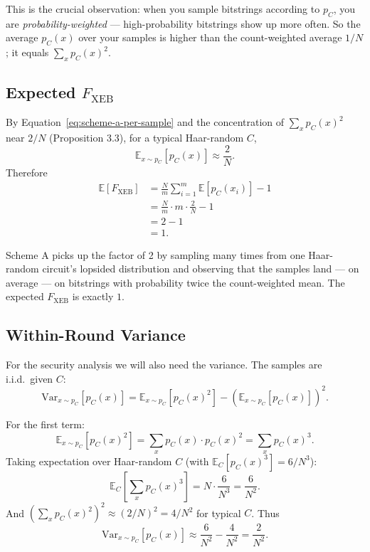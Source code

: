 \documentclass[11pt]{article}
\theoremstyle{plain}
\theoremstyle{definition}
\newcommand{\Fxeb}{F_{\text{XEB}}}
\newcommand{\E}{\mathbb{E}}
\newcommand{\Var}{\mathrm{Var}}
\begin{document}
\begin{intuition}
This is the crucial observation: when you sample bitstrings according to $p_C$, you are \emph{probability-weighted} --- high-probability bitstrings show up more often. So the average $p_C(x)$ over your samples is higher than the count-weighted average $1/N$; it equals $\sum_x p_C(x)^2$.
\end{intuition}

\subsection{Expected $\Fxeb$}

By Equation~\eqref{eq:scheme-a-per-sample} and the concentration of $\sum_x p_C(x)^2$ near $2/N$ (Proposition 3.3), for a typical Haar-random $C$,
\[
\E_{x \sim p_C}[p_C(x)] \approx \frac{2}{N}.
\]
Therefore
\begin{align}
\E[\Fxeb] &= \frac{N}{m} \sum_{i=1}^{m} \E[p_C(x_i)] - 1 \nonumber \\
          &= \frac{N}{m} \cdot m \cdot \frac{2}{N} - 1 \nonumber \\
          &= 2 - 1 \nonumber \\
          &= 1.
\label{eq:scheme-a-expectation}
\end{align}

\begin{intuition}
Scheme A picks up the factor of 2 by sampling many times from one Haar-random circuit's lopsided distribution and observing that the samples land --- on average --- on bitstrings with probability twice the count-weighted mean. The expected $\Fxeb$ is exactly $1$.
\end{intuition}

\subsection{Within-Round Variance}

For the security analysis we will also need the variance. The samples are i.i.d.\ given $C$:
\begin{equation}
\Var_{x \sim p_C}[p_C(x)] = \E_{x \sim p_C}[p_C(x)^2] - \left(\E_{x \sim p_C}[p_C(x)]\right)^2.
\label{eq:scheme-a-var-def}
\end{equation}

For the first term:
\[
\E_{x \sim p_C}[p_C(x)^2] = \sum_x p_C(x) \cdot p_C(x)^2 = \sum_x p_C(x)^3.
\]
Taking expectation over Haar-random $C$ (with $\E_C[p_C(x)^3] = 6/N^3$):
\[
\E_C\!\left[\sum_x p_C(x)^3\right] = N \cdot \frac{6}{N^3} = \frac{6}{N^2}.
\]
And $\left(\sum_x p_C(x)^2\right)^2 \approx (2/N)^2 = 4/N^2$ for typical $C$. Thus
\begin{equation}
\Var_{x \sim p_C}[p_C(x)] \approx \frac{6}{N^2} - \frac{4}{N^2} = \frac{2}{N^2}.
\label{eq:scheme-a-within-var}
\end{equation}
\end{document}

